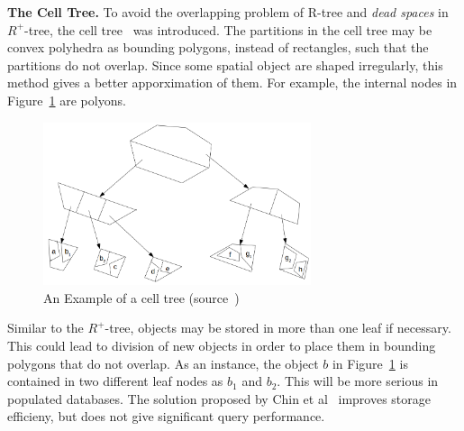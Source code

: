\documentclass[a4paper,12pt]{article}
\begin{document}
\textbf{The Cell Tree.}
To avoid the overlapping problem of R-tree and \textit{dead spaces} in $R^+$-tree, the cell tree~\cite{celltree} was introduced. The partitions in the cell tree may be convex polyhedra as bounding polygons, instead of rectangles, such that the partitions do not overlap. 
Since some spatial object are shaped irregularly, this method gives a better apporximation of them.
For example, the internal nodes in Figure~\ref{figcelltree} are polyons. 
\begin{figure}
\centering
\includegraphics[width=0.7\textwidth]{CellTree}
\caption{An Example of a cell tree (source~\cite{survey})}
\label{figcelltree}
\end{figure} 

Similar to the $R^+$-tree, objects may be stored in more than one leaf if necessary. This could lead to division of new objects in order to place them in bounding polygons that do not overlap. 
As an instance, the object $b$ in Figure~\ref{figcelltree} is contained in two different leaf nodes as $b_1$ and $b_2$.
This will be more serious in populated databases. The solution proposed by Chin et al~\cite{survey} improves storage efficieny, but does not give significant query performance. 
\end{document}
